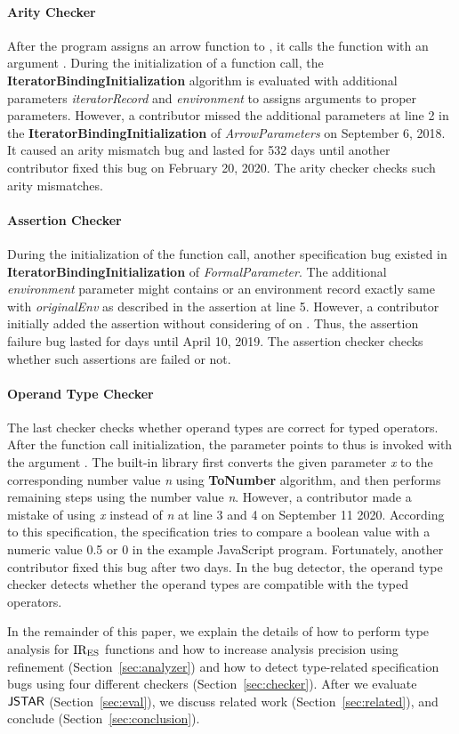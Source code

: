 \paragraph{Arity Checker} After the program assigns an arrow function to
, it calls the function with an argument .  During the
initialization of a function call, the \textbf{IteratorBindingInitialization}
algorithm is evaluated with additional parameters \textit{iteratorRecord} and
\textit{environment} to assigns arguments to proper parameters.  However, a
contributor missed the additional parameters at line 2 in the
\textbf{IteratorBindingInitialization} of \textit{ArrowParameters} on September
6, 2018.  It caused an arity mismatch bug and lasted for 532 days until another
contributor fixed this bug on February 20, 2020.  The arity checker checks such
arity mismatches.

\paragraph{Assertion Checker} During the initialization of the function call,
another specification bug existed in \textbf{IteratorBindingInitialization} of
\textit{FormalParameter}.  The additional \textit{environment} parameter might
contains  or an environment record exactly same with
\textit{originalEnv} as described in the assertion at line 5.  However, a
contributor initially added the assertion without considering of
 on .  Thus, the assertion failure bug
lasted for  days until April 10, 2019.  The assertion checker checks
whether such assertions are failed or not.

\paragraph{Operand Type Checker} The last checker checks whether operand types
are correct for typed operators.  After the function call initialization, the
parameter  points to  thus  is invoked
with the argument .  The  built-in library
first converts the given parameter \textit{x} to the corresponding number value
\textit{n} using \textbf{ToNumber} algorithm, and then performs remaining steps
using the number value \textit{n}.  However, a contributor made a mistake of
using \textit{x} instead of \textit{n} at line 3 and 4 on September 11 2020.
According to this specification, the specification tries to compare a boolean
value  with a numeric value 0.5 or 0 in the example JavaScript
program.  Fortunately, another contributor fixed this bug after two days.  In
the bug detector, the operand type checker detects whether the operand types are
compatible with the typed operators.

In the remainder of this paper, we explain the details of how to perform type
analysis for ${\text{IR}_\text{ES}}$ functions and how to increase analysis precision using
refinement (Section~\ref{sec:analyzer}) and how to detect type-related
specification bugs using four different checkers (Section~\ref{sec:checker}).
After we evaluate $\textsf{JSTAR}$ (Section~\ref{sec:eval}), we discuss related work
(Section~\ref{sec:related}), and conclude (Section~\ref{sec:conclusion}).
